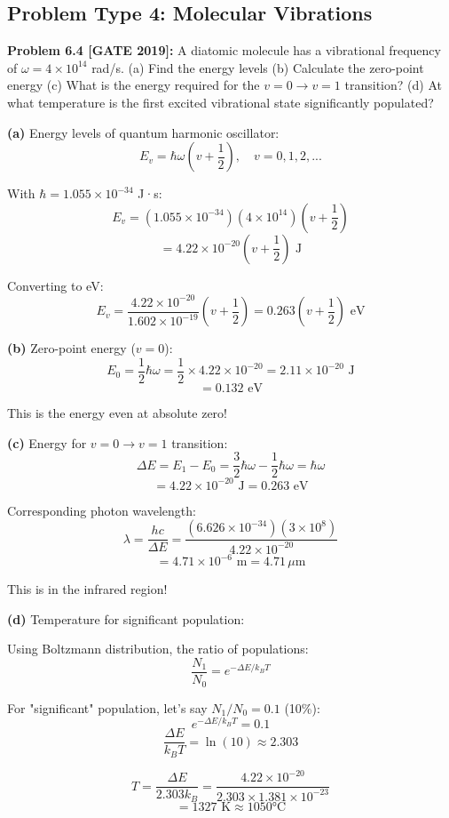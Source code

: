 \documentclass[12pt,a4paper]{article}
\begin{document}
\subsection{Problem Type 4: Molecular Vibrations}

\textbf{Problem 6.4 [GATE 2019]:} A diatomic molecule has a vibrational frequency of $\omega = 4 \times 10^{14}$ rad/s.
(a) Find the energy levels
(b) Calculate the zero-point energy
(c) What is the energy required for the $v=0 \to v=1$ transition?
(d) At what temperature is the first excited vibrational state significantly populated?

\begin{solution}
\textbf{(a)} Energy levels of quantum harmonic oscillator:
$$E_v = \hbar\omega\left(v + \frac{1}{2}\right), \quad v = 0, 1, 2, ...$$

With $\hbar = 1.055 \times 10^{-34}$ J·s:
$$E_v = (1.055 \times 10^{-34})(4 \times 10^{14})\left(v + \frac{1}{2}\right)$$
$$= 4.22 \times 10^{-20}\left(v + \frac{1}{2}\right)\text{ J}$$

Converting to eV:
$$E_v = \frac{4.22 \times 10^{-20}}{1.602 \times 10^{-19}}\left(v + \frac{1}{2}\right) = 0.263\left(v + \frac{1}{2}\right)\text{ eV}$$

\textbf{(b)} Zero-point energy ($v = 0$):
$$E_0 = \frac{1}{2}\hbar\omega = \frac{1}{2} \times 4.22 \times 10^{-20} = 2.11 \times 10^{-20}\text{ J}$$
$$= 0.132\text{ eV}$$

This is the energy even at absolute zero!

\textbf{(c)} Energy for $v=0 \to v=1$ transition:
$$\Delta E = E_1 - E_0 = \frac{3}{2}\hbar\omega - \frac{1}{2}\hbar\omega = \hbar\omega$$
$$= 4.22 \times 10^{-20}\text{ J} = 0.263\text{ eV}$$

Corresponding photon wavelength:
$$\lambda = \frac{hc}{\Delta E} = \frac{(6.626 \times 10^{-34})(3 \times 10^8)}{4.22 \times 10^{-20}}$$
$$= 4.71 \times 10^{-6}\text{ m} = 4.71\,\mu\text{m}$$

This is in the infrared region!

\textbf{(d)} Temperature for significant population:

Using Boltzmann distribution, the ratio of populations:
$$\frac{N_1}{N_0} = e^{-\Delta E/k_BT}$$

For "significant" population, let's say $N_1/N_0 = 0.1$ (10\%):
$$e^{-\Delta E/k_BT} = 0.1$$
$$\frac{\Delta E}{k_BT} = \ln(10) \approx 2.303$$

$$T = \frac{\Delta E}{2.303 k_B} = \frac{4.22 \times 10^{-20}}{2.303 \times 1.381 \times 10^{-23}}$$
$$= 1327\text{ K} \approx 1050°\text{C}$$


\end{solution}
\end{document}
